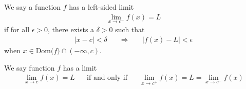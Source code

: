 \begin{definition}
We say a function $f$ has a left-sided limit
\begin{align*}
    \lim_{x \longrightarrow c^{-}} f(x) = L
\end{align*}
if for all $\epsilon > 0$, there exists a $\delta > 0$ such that
\begin{align*}
    \lvert x - c \rvert < \delta \hspace{20pt} \Longrightarrow \hspace{20pt} \lvert f(x) - L \rvert < \epsilon
\end{align*}
when $x \in \text{Dom($f$)} \cap (-\infty, c)$.
\end{definition}

\begin{theorem}
We say function $f$ has a limit
\begin{align*}
    \lim_{x \longrightarrow c} f(x) = L \hspace{20pt} \text{if and only if} \hspace{20pt} \lim_{x \longrightarrow c^{+}} f(x) = L = \lim_{x \longrightarrow c^{-}} f(x)
\end{align*}
\end{theorem}

